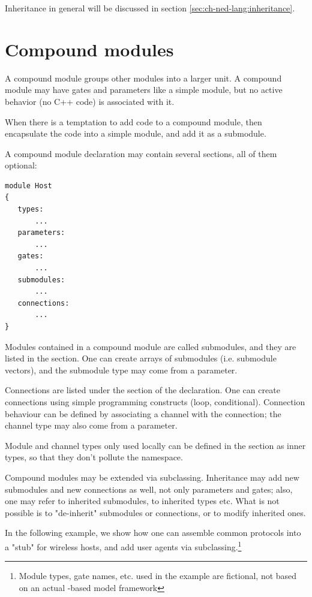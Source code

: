 Inheritance in general will be discussed in section \ref{sec:ch-ned-lang:inheritance}.



\section{Compound modules}
\label{sec:ch-ned-lang:compound-modules}

A compound module groups other modules into a larger unit. A compound
module may have gates and parameters like a simple module, but
no active behavior (no C++ code) is associated with it.

\begin{note}
    When there is a temptation to add code to a compound module,
    then encapsulate the code into a simple module, and add it as
    a submodule.
\end{note}

A compound module declaration may contain several sections,
all of them optional:

\begin{Verbatim}
module Host
{
   types:
       ...
   parameters:
       ...
   gates:
       ...
   submodules:
       ...
   connections:
       ...
}
\end{Verbatim}

Modules contained in a compound module are called submodules, and they are
listed in the  section. One can create arrays of submodules
(i.e. submodule vectors), and the submodule type may come from a parameter.

Connections are listed under the  section of the
declaration. One can create connections using simple programming constructs
(loop, conditional). Connection behaviour can be defined by associating a
channel with the connection; the channel type may also come from a
parameter.

Module and channel types only used locally can be defined in the
 section as inner types, so that they don't pollute the
namespace.

Compound modules may be extended via subclassing. Inheritance may add new
submodules and new connections as well, not only parameters and gates;
also, one may refer to inherited submodules, to inherited types etc. What
is not possible is to "de-inherit" submodules or connections, or to modify
inherited ones.

In the following example, we show how one can assemble common protocols
into a "stub" for wireless hosts, and add user agents via
subclassing.\footnote{Module types, gate names, etc. used in the example
are fictional, not based on an actual {\opp}-based model framework}

